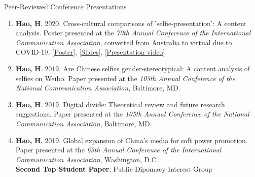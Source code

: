 \documentclass{resume}
\begin{document}
\begin{rSection}{Peer-Reviewed Conference Presentations}
\begin{enumerate}[leftmargin=0.5cm]
    \item \hspace{-0.2cm} \textbf{ Hao, H}. 2020. Cross-cultural comparisons of 'selfie-presentation': A content analysis. Poster presented at the \textit{70th Annual Conference of the International Communication Association}, converted from Australia to virtual due to COVID-19. \hspace{2em} [\href{https://hongtaoh.com/files/ICA_Poster_Actual_Size.pdf}{Poster}], [\href{https://hongtaoh.com/slides/ICA2020.html#1}{Slides}], [\href{https://player.vimeo.com/video/418504580}{Presentation video}]
    \item \vspace{-0.3em} \textbf{Hao, H}. 2019. Are Chinese selfies gender-stereotypical: A content analysis of selfies on Weibo. Paper presented at the \textit{105th Annual Conference of the National Communication Association}, Baltimore, MD.
    \item \vspace{-0.3em} \textbf{Hao, H}. 2019. Digital divide: Theoretical review and future research suggestions. Paper presented at the \textit{105th Annual Conference of the National Communication Association}, Baltimore, MD.
    \item \vspace{-0.3em} \textbf{Hao, H}. 2019. Global expansion of China’s media for soft power promotion. Paper presented at the \textit{69th Annual Conference of the International Communication Association}, Washington, D.C. \\
    \faTrophy \hspace{0.5em} \textbf{Second Top Student Paper}, Public Dipomacy Interest Group
\end{enumerate}

\end{rSection}
\end{document}
